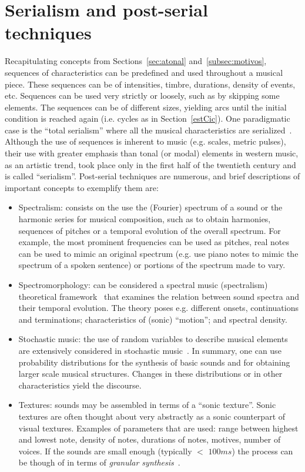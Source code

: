 \documentclass[format=acmsmall, review=false, screen=true]{acmart}
\begin{document}
\section{Serialism and post-serial techniques}
Recapitulating concepts from Sections~\ref{sec:atonal} and~\ref{subsec:motivos},
sequences of characteristics can be predefined and
used throughout a musical piece.
These sequences can be of intensities, timbre, durations,
density of events, etc.
Sequences can be used very strictly or loosely,
such as by skipping some elements.
The sequences can be of different sizes, yielding arcs
until the initial condition is reached again (i.e. cycles as in Section~\ref{estCic}).
One paradigmatic case is the ``total serialism'' where all
the musical characteristics are serialized~\cite{Lovelock}.
Although the use of sequences is inherent to music (e.g. scales, metric pulses),
their use with greater emphasis than tonal (or modal) elements
in western music, as an artistic trend, took place only in the
first half of the twentieth century and is called ``serialism''.
Post-serial techniques are numerous, and brief descriptions of
important concepts to exemplify them are:
\begin{itemize}
	\item Spectralism:
		consists on the use the (Fourier) spectrum of a sound or the harmonic series for musical composition,
		such as
		to obtain harmonies, sequences of pitches or a temporal evolution of the overall spectrum.
		For example, the most prominent frequencies can be used as pitches,
		real notes can be used to mimic an original spectrum
		(e.g. use piano notes to mimic the spectrum of a spoken sentence) or portions of the spectrum made to vary.~\cite{grisey}
	\item Spectromorphology:
		can be considered a spectral music (spectralism) theoretical framework~\cite{smalley,schaeffer}
		that examines the relation between sound spectra and their temporal evolution.
		The theory poses e.g. different onsets, continuations and terminations; characteristics of (sonic) ``motion'';
		and spectral density.
	\item Stochastic music:
		the use of random variables to describe musical elements are extensively considered in stochastic music~\cite{formalized}.
		In summary, one can use probability distributions for the synthesis of basic sounds and for obtaining larger scale musical structures.
		Changes in these distributions or in other characteristics yield the discourse.
	\item Textures:
		sounds may be assembled in terms of a ``sonic texture''.
		Sonic textures are often thought about very abstractly
		as a sonic counterpart of visual textures.
		Examples of parameters that are used: range between highest and lowest note,
		density of notes, durations of notes, motives, number of voices.
		If the sounds are small enough (typically $<$ $100ms$) the process can be though of in terms of \emph{granular synthesis}~\cite{microsound}.
\end{itemize}
\end{document}
